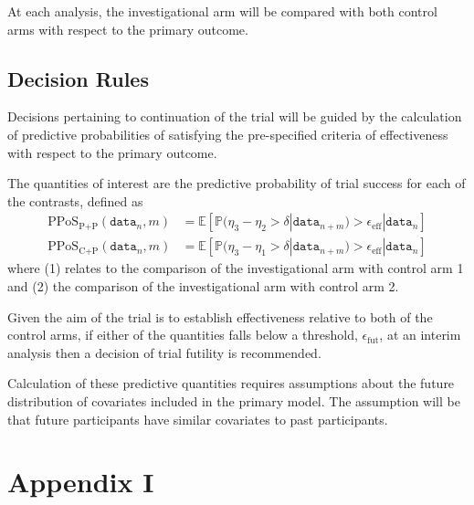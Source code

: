 \documentclass[11pt,parskip=half-]{scrartcl}
\begin{document}
At each analysis, the investigational arm will be compared with both control arms with respect to the primary outcome.

\subsection{Decision Rules}

Decisions pertaining to continuation of the trial will be guided by the calculation of predictive probabilities of satisfying the pre-specified criteria of effectiveness with respect to the primary outcome.

The quantities of interest are the predictive probability of trial success for each of the contrasts, defined as
\begin{align}
    \text{PPoS}_{\text{P+P}}(\texttt{data}_n, m) & = \mathbb{E}[\mathbb{P}(\eta_3 - \eta_2 > \delta | \texttt{data}_{n+m}) > \epsilon_{\text{eff}} | \texttt{data}_n] \\
    \text{PPoS}_{\text{C+P}}(\texttt{data}_n, m) & = \mathbb{E}[\mathbb{P}(\eta_3 - \eta_1 > \delta | \texttt{data}_{n+m}) > \epsilon_{\text{eff}} | \texttt{data}_n]
\end{align}
where (1) relates to the comparison of the investigational arm with control arm 1 and (2) the comparison of the investigational arm with control arm 2.

Given the aim of the trial is to establish effectiveness relative to both of the control arms, if either of the quantities falls below a threshold, $\epsilon_{\text{fut}}$, at an interim analysis then a decision of trial futility is recommended.

Calculation of these predictive quantities requires assumptions about the future distribution of covariates included in the primary model. The assumption will be that future participants have similar covariates to past participants.

\clearpage

\printbibliography[heading=bibintoc]

\clearpage

\section*{Appendix I}
\end{document}
